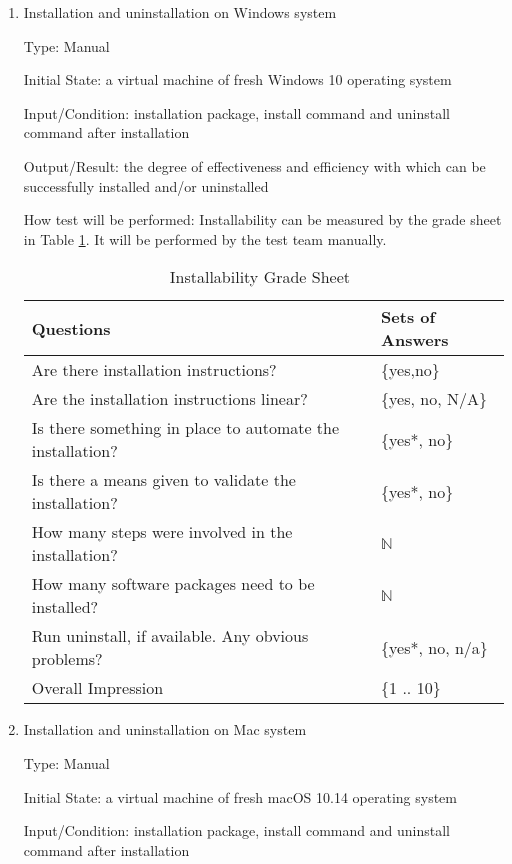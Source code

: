 \documentclass[12pt, titlepage]{article}
\begin{document}
\begin{enumerate}

\item{Installation and uninstallation on Windows system}
\label{sec_InstallWindows}

Type: Manual
					
Initial State: a virtual machine of fresh Windows 10 operating system
					
Input/Condition: \progname{} installation package, install command and
uninstall command after installation
					
Output/Result: the degree of effectiveness and efficiency with which
\progname{}can be successfully installed and/or uninstalled
					
How test will be performed: Installability can be measured by the grade sheet
in Table \ref{Tb_install}. It will be performed by the test team manually.

\begin{table}[h]
\begin{tabular}{@{}ll@{}}
\toprule
Questions & Sets of Answers \\ \midrule
Are there installation instructions? & \{yes,no\} \\
Are the installation instructions linear? & \{yes, no, N/A\} \\
Is there something in place to automate the installation? & \{yes*, no\} \\
Is there a means given to validate the installation? & \{yes*, no\} \\
How many steps were involved in the installation? & $\mathbb{N}$ \\
How many software packages need to be installed? & $\mathbb{N}$ \\
Run uninstall, if available. Any obvious problems? & \{yes*, no, n/a\} \\
Overall Impression & \{1 .. 10\}\\ \bottomrule
\end{tabular}
\caption{Installability Grade Sheet~\cite{SmithEtAl2018}}
\label{Tb_install}
\end{table}

\item{Installation and uninstallation on Mac system}

Type: Manual
					
Initial State: a virtual machine of fresh macOS 10.14 operating system
					
Input/Condition: \progname{} installation package, install command and
uninstall command after installation
					

\end{enumerate}
\end{document}
